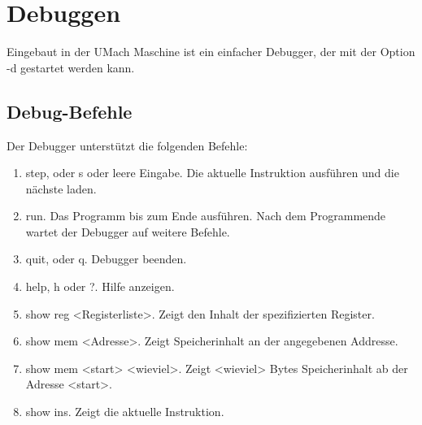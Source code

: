 \section{Debuggen}
\label{sec:debuggen}

Eingebaut in der UMach Maschine ist ein einfacher Debugger, der mit der Option
\glqq{}-d\grqq{} gestartet werden kann. 

\subsection{Debug-Befehle}

Der Debugger unterstützt die folgenden Befehle:

\begin{enumerate}
 \item step, oder s oder leere Eingabe. 
       Die aktuelle Instruktion ausführen und die nächste laden.
 \item run. Das Programm bis zum Ende ausführen. Nach dem Programmende wartet
       der Debugger auf weitere Befehle.
 \item quit, oder q. Debugger beenden.
 \item help, h oder ?. Hilfe anzeigen.
 \item show reg <Registerliste>. Zeigt den Inhalt der spezifizierten Register.
 \item show mem <Adresse>. Zeigt Speicherinhalt an der angegebenen Addresse.
 \item show mem <start> <wieviel>. Zeigt <wieviel> Bytes Speicherinhalt ab
       der Adresse <start>.
 \item show ins. Zeigt die aktuelle Instruktion.
\end{enumerate}

